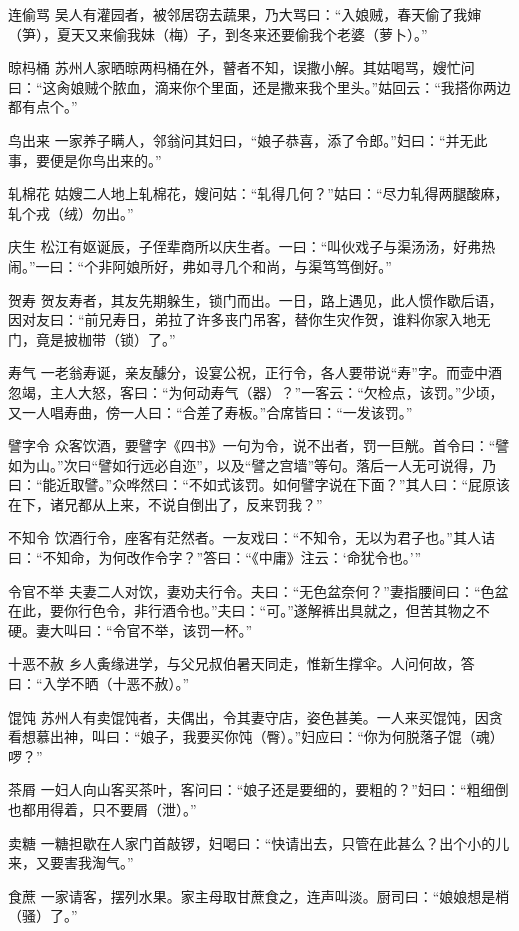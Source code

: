 \documentclass[12pt,UTF8]{ctexbook}
\begin{document}
连偷骂
吴人有灌园者，被邻居窃去蔬果，乃大骂曰：“入娘贼，春天偷了我婶（笋），夏天又来偷我妹（梅）子，到冬来还要偷我个老婆（萝卜）。”

晾杩桶
苏州人家晒晾两杩桶在外，瞽者不知，误撒小解。其姑喝骂，嫂忙问曰：“这肏娘贼个脓血，滴来你个里面，还是撒来我个里头。”姑回云：“我搭你两边都有点个。”

鸟出来
一家养子瞒人，邻翁问其妇曰，“娘子恭喜，添了令郎。”妇曰：“并无此事，要便是你鸟出来的。”

轧棉花
姑嫂二人地上轧棉花，嫂问姑：“轧得几何？”姑曰：“尽力轧得两腿酸麻，轧个戎（绒）勿出。”

庆生
松江有妪诞辰，子侄辈商所以庆生者。一曰：“叫伙戏子与渠汤汤，好弗热闹。”一曰：“个非阿娘所好，弗如寻几个和尚，与渠笃笃倒好。”

贺寿
贺友寿者，其友先期躲生，锁门而出。一日，路上遇见，此人惯作歇后语，因对友曰：“前兄寿日，弟拉了许多丧门吊客，替你生灾作贺，谁料你家入地无门，竟是披枷带（锁）了。”

寿气
一老翁寿诞，亲友醵分，设宴公祝，正行令，各人要带说“寿”字。而壶中酒忽竭，主人大怒，客曰：“为何动寿气（器）？”一客云：“欠检点，该罚。”少顷，又一人唱寿曲，傍一人曰：“合差了寿板。”合席皆曰：“一发该罚。”

譬字令
众客饮酒，要譬字《四书》一句为令，说不出者，罚一巨觥。首令曰：“譬如为山。”次曰“譬如行远必自迩”，以及“譬之宫墙”等句。落后一人无可说得，乃曰：“能近取譬。”众哗然曰：“不如式该罚。如何譬字说在下面？”其人曰：“屁原该在下，诸兄都从上来，不说自倒出了，反来罚我？”

不知令
饮酒行令，座客有茫然者。一友戏曰：“不知令，无以为君子也。”其人诘曰：“不知命，为何改作令字？”答曰：“《中庸》注云：‘命犹令也。’”

令官不举
夫妻二人对饮，妻劝夫行令。夫曰：“无色盆奈何？”妻指腰间曰：“色盆在此，要你行色令，非行酒令也。”夫曰：“可。”遂解裤出具就之，但苦其物之不硬。妻大叫曰：“令官不举，该罚一杯。”

十恶不赦
乡人夤缘进学，与父兄叔伯暑天同走，惟新生撑伞。人问何故，答曰：“入学不晒（十恶不赦）。”

馄饨
苏州人有卖馄饨者，夫偶出，令其妻守店，姿色甚美。一人来买馄饨，因贪看想慕出神，叫曰：“娘子，我要买你饨（臀）。”妇应曰：“你为何脱落子馄（魂）啰？”

茶屑
一妇人向山客买茶叶，客问曰：“娘子还是要细的，要粗的？”妇曰：“粗细倒也都用得着，只不要屑（泄）。”

卖糖
一糖担歇在人家门首敲锣，妇喝曰：“快请出去，只管在此甚么？出个小的儿来，又要害我淘气。”

食蔗
一家请客，摆列水果。家主母取甘蔗食之，连声叫淡。厨司曰：“娘娘想是梢（骚）了。”
\end{document}
